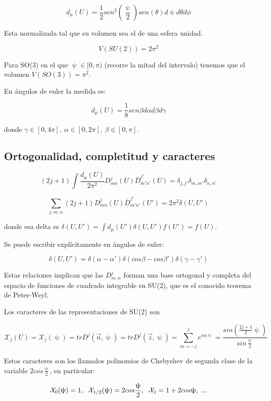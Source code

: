 \documentclass{article}
\begin{document}
        $$d_\mu (U)=\frac{1}{2}sen^2(\frac{\uppsi}{2})sen(\theta) d\uppsi d\theta d\phi$$

        Esta normalizada tal que su volumen sea el de una esfera unidad.

        $$V(SU(2))=2\pi ^2$$

        Para SO(3) en el que $\uppsi \in [0,\pi )$ (recorre la mitad del intervalo) tenemos que el volumen $V(SO(3))=\pi ^2$.

        \smallskip
        En ángulos de euler la medida es:

        $$d_\mu (U)=\frac{1}{8}sen \beta d\alpha d\beta d\gamma$$

        donde $\gamma \in [0,4\pi], \ \alpha \in [0,2\pi], \ \beta \in [0,\pi]$.

        \subsection{Ortogonalidad, completitud y caracteres}

        $$(2j+1)\int \frac{d_\mu (U)}{2\pi^2} D^j_{mn}(U)\bar{D}_{m'n'}^{j'}(U)=\delta _{j,j'}\delta _{m,m'}\delta _{n,n'}$$

        $$\sum _{j,m,n} (2j+1)D^j_{mn}(U)\bar{D}_{m'n'}^{j'}(U')=2\pi ^2 \delta (U,U')$$

        donde esa delta es $\delta (U,U')=\int d_\mu (U')\delta (U,U') f(U') =f(U)$.

        Se puede escribir explícitamente en ángulos de euler:

        $$\delta (U,U')=\delta (\alpha - \alpha ')\delta (cos \beta - cos \beta ')\delta (\gamma - \gamma ')$$


        Estas relaciones implican que las $D_{m,n}^j$ forman una base ortogonal y completa del espacio de funciones de cuadrado integrable en SU(2), que es el conocido teorema de Peter-Weyl.

        \smallskip
        Los caracteres de las representaciones de SU(2) son

        $$\mathcal{X}_j(U)=\mathcal{X}_j(\uppsi)=trD^j(\Vec{n},\uppsi)=trD^j(\Vec{z},\uppsi)=\sum _{m=-j}^j e^{im\uppsi}=\frac{sin (\frac{2j+1}{2}\uppsi)}{sin \frac{\uppsi}{2}}$$

        Estos caracteres son los llamados polinomios de Chebyshev de segunda clase de la variable $2cos\frac{\uppsi}{2}$, en particular:

        $$\mathcal{X}_0(\uppsi)=1, \hspace{0.2cm} \mathcal{X}_{1/2}(\uppsi)=2cos \frac{\uppsi}{2}, \hspace{0.2cm} \mathcal{X}_1=1+2cos\uppsi , \ ...$$
\end{document}
